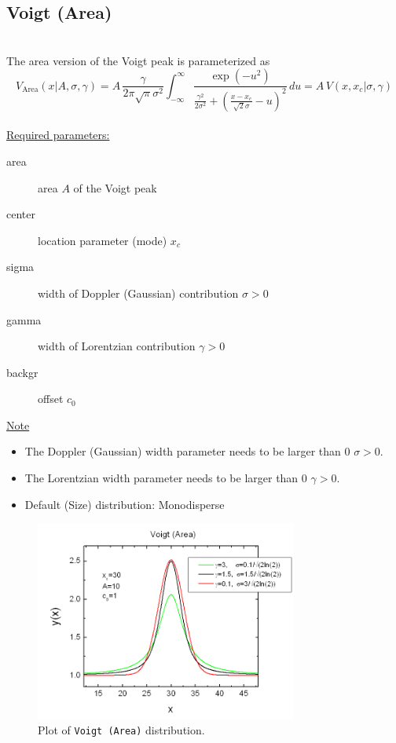 \clearpage

\subsection{Voigt (Area)} ~\\[5mm]
\label{sec:VoigtArea}
The area version of the Voigt peak is parameterized as
\begin{equation}
V_\text{Area}(x\vert A,\sigma,\gamma)
= A \, \frac{\gamma}{2\pi\sqrt{\pi}\sigma^2} \int_{-\infty}^\infty \frac{\exp(-u^2)}{\frac{\gamma^2}{2\sigma^2}+\left( \frac{x-x_c}{\sqrt{2}\sigma}-u\right)^2} \, du
= A \, V(x,x_c\vert\sigma,\gamma)
\end{equation}
~\\

\uline{Required parameters:}
\begin{description}
    \item[area] area $A$ of the Voigt peak
    \item[center] location parameter (mode) $x_c$
    \item[sigma] width of Doppler (Gaussian) contribution $\sigma>0$
    \item[gamma] width of Lorentzian contribution $\gamma>0$
    \item[backgr] offset $c_0$
\end{description}

\uline{Note}
\begin{itemize}
  \item The Doppler (Gaussian) width parameter needs to be larger than 0 $\sigma>0$.
  \item The Lorentzian width parameter needs to be larger than 0 $\gamma>0$.
  \item Default (Size) distribution: Monodisperse
\end{itemize}


\begin{figure}[htb]
\begin{center}
\includegraphics[width=0.768\textwidth]{VoigtArea.png}
\end{center}
\caption{Plot of \texttt{Voigt (Area)} distribution.}
\label{fig:VoigtArea}
\end{figure}


